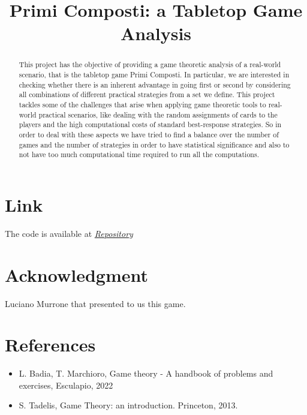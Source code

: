 \documentclass[conference]{IEEEtran}
\begin{document}
\title{Primi Composti: a Tabletop Game Analysis}

\author{
\and
{}
\and
{}
}
\maketitle

\begin{abstract}
	This project has the objective of providing a game theoretic analysis of a real-world scenario, that is the tabletop game Primi Composti. In particular, we are interested in checking whether there is an inherent advantage in going first or second by considering all combinations of different practical strategies from a set we define.
	This project tackles some of the challenges that arise when applying game theoretic tools to real-world practical scenarios, like dealing with the random assignments of cards to the players and the high computational costs of standard best-response strategies. So in order to deal with these aspects we have tried to find a balance over the number of games and the number of strategies in order to have statistical significance and also to not have too much computational time required to run all the computations.
\end{abstract}






\section*{Link}
The code is available at \href{https://github.com/Sproc01/GT_PrimeComposite.git}{\textit{Repository}}

\section*{Acknowledgment}
Luciano Murrone that presented to us this game.

\section*{References}
\begin{itemize}
    \item L. Badia, T. Marchioro, Game theory - A handbook of problems and exercises, Esculapio, 2022
    \item S. Tadelis, Game Theory: an introduction. Princeton, 2013.
\end{itemize}
\end{document}
